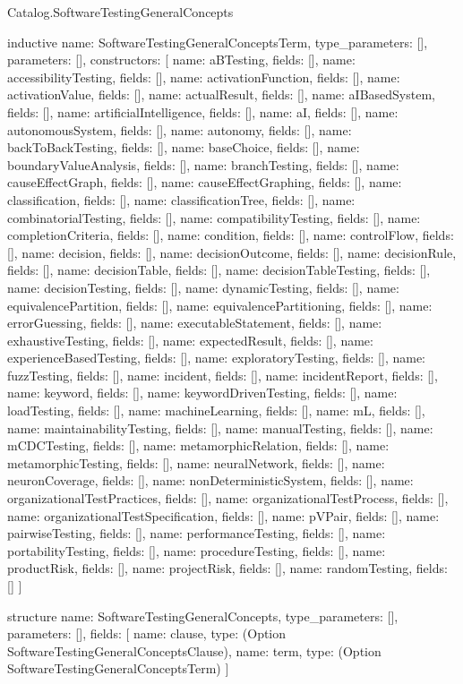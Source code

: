 \begin{lexlean}{Catalog.SoftwareTestingGeneralConcepts}
\begin{semanticmodule}
inductive{
  name: SoftwareTestingGeneralConceptsTerm,
  type_parameters: [],
  parameters: [],
  constructors: [
    {name: aBTesting, fields: []},
    {name: accessibilityTesting, fields: []},
    {name: activationFunction, fields: []},
    {name: activationValue, fields: []},
    {name: actualResult, fields: []},
    {name: aIBasedSystem, fields: []},
    {name: artificialIntelligence, fields: []},
    {name: aI, fields: []},
    {name: autonomousSystem, fields: []},
    {name: autonomy, fields: []},
    {name: backToBackTesting, fields: []},
    {name: baseChoice, fields: []},
    {name: boundaryValueAnalysis, fields: []},
    {name: branchTesting, fields: []},
    {name: causeEffectGraph, fields: []},
    {name: causeEffectGraphing, fields: []},
    {name: classification, fields: []},
    {name: classificationTree, fields: []},
    {name: combinatorialTesting, fields: []},
    {name: compatibilityTesting, fields: []},
    {name: completionCriteria, fields: []},
    {name: condition, fields: []},
    {name: controlFlow, fields: []},
    {name: decision, fields: []},
    {name: decisionOutcome, fields: []},
    {name: decisionRule, fields: []},
    {name: decisionTable, fields: []},
    {name: decisionTableTesting, fields: []},
    {name: decisionTesting, fields: []},
    {name: dynamicTesting, fields: []},
    {name: equivalencePartition, fields: []},
    {name: equivalencePartitioning, fields: []},
    {name: errorGuessing, fields: []},
    {name: executableStatement, fields: []},
    {name: exhaustiveTesting, fields: []},
    {name: expectedResult, fields: []},
    {name: experienceBasedTesting, fields: []},
    {name: exploratoryTesting, fields: []},
    {name: fuzzTesting, fields: []},
    {name: incident, fields: []},
    {name: incidentReport, fields: []},
    {name: keyword, fields: []},
    {name: keywordDrivenTesting, fields: []},
    {name: loadTesting, fields: []},
    {name: machineLearning, fields: []},
    {name: mL, fields: []},
    {name: maintainabilityTesting, fields: []},
    {name: manualTesting, fields: []},
    {name: mCDCTesting, fields: []},
    {name: metamorphicRelation, fields: []},
    {name: metamorphicTesting, fields: []},
    {name: neuralNetwork, fields: []},
    {name: neuronCoverage, fields: []},
    {name: nonDeterministicSystem, fields: []},
    {name: organizationalTestPractices, fields: []},
    {name: organizationalTestProcess, fields: []},
    {name: organizationalTestSpecification, fields: []},
    {name: pVPair, fields: []},
    {name: pairwiseTesting, fields: []},
    {name: performanceTesting, fields: []},
    {name: portabilityTesting, fields: []},
    {name: procedureTesting, fields: []},
    {name: productRisk, fields: []},
    {name: projectRisk, fields: []},
    {name: randomTesting, fields: []}
  ]
}

structure{
  name: SoftwareTestingGeneralConcepts,
  type_parameters: [],
  parameters: [],
  fields: [
    {name: clause, type: (Option SoftwareTestingGeneralConceptsClause)},
    {name: term, type: (Option SoftwareTestingGeneralConceptsTerm)}
  ]
}
\end{semanticmodule}
\end{lexlean}
